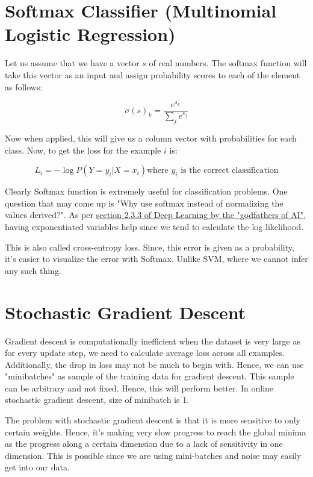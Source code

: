 \section{Softmax Classifier (Multinomial Logistic Regression)}

Let us assume that we have a vector $s$ of real numbers. The softmax function will take this vector as an input and assign probability scores to each of the element as follows:

\begin{equation}
    \sigma(s)_k = \frac{e^{s_k}}{\sum_j e^{s_j}}
\end{equation}

Now when applied, this will give us a column vector with probabilities for each class. Now, to get the loss for the example $i$ is:

\begin{equation}
    L_i = -\log P(Y=y_i | X=x_i) \text{where $y_i$ is the correct classification}
\end{equation}

Clearly Softmax function is extremely useful for classification problems. One question that may come up is "Why use softmax instead of normalizing the values derived?". As per \href{http://93.174.95.29/main/11874B3F9B89BAB4C7826272B2EFC032}{section 2.3.3 of Deep Learning by the "godfathers of AI"}, having exponentiated variables help since we tend to calculate the log likelihood.

This is also called cross-entropy loss. Since, this error is given as a probability, it's easier to visualize the error with Softmax. Unlike SVM, where we cannot infer any such thing.

\section{Stochastic Gradient Descent}

Gradient descent is computationally inefficient when the dataset is very large as for every update step, we need to calculate average loss across all examples. Additionally, the drop in loss may not be much to begin with. Hence, we can use "minibatches" as sample of the training data for gradient descent. This sample can be arbitrary and not fixed. Hence, this will perform better. In online stochastic gradient descent, size of minibatch is 1.

The problem with stochastic gradient descent is that it is more sensitive to only certain weights. Hence, it's making very slow progress to reach the global minima as the progress along a certain dimension due to a lack of sensitivity in one dimension. This is possible since we are using mini-batches and noise may easily get into our data.

